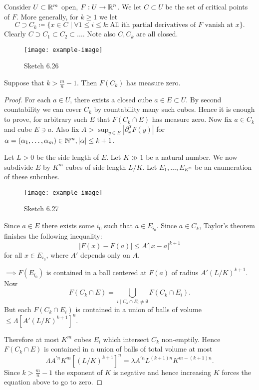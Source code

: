  Consider \(U\subset\mathbb{R}^m\) open, \(F:U\to \mathbb{R}^n\). We let \(C\subset U\)
be the set of critical points of \(F\). More generally, for \(k\geq 1\) we let 
\[C\supset C_k\coloneqq \{x\in C\mid \forall 1\leq i\leq k: \text{All ith partial derivatives of }F\text{ vanish at }x\}.\]
Clearly \(C\supset C_1\subset C_2\subset \dots \). Note also \(C,C_k\) are all closed.
\begin{figure}[H]\label{fig:6.26}
    \centering
    \texttt{[image: example-image]}
    \caption{Sketch 6.26}
\end{figure}

\begin{lemma}\label{lem:6.14}
    Suppose that \(k>\frac{m}{n}-1\). Then \(F(C_k)\) has measure zero.
\end{lemma}

\begin{proof}
    For each \(a\in U\), there exists a closed cube \(a\in E\subset U\). By second countability 
    we can cover \(C_k\) by countability many such cubes. Hence it is enough to prove, for arbitrary 
    such \(E\) that \(F(C_k\cap E)\) has measure zero. Now fix \(a\in C_k\) and cube \(E\ni a\). Also 
    fix \(A>\sup_{y\in E}|\partial_x^{\alpha} F(y)|\) for \(\alpha=(\alpha_1,\dots,\alpha_m)\in \mathbb{N}^m,|\alpha|\leq k+1\).

    Let \(L>0\) be the side length of \(E\). Let \(K\gg 1\) be a natural number.
    We now subdivide \(E\) by \(K^m\) cubes of side length  \(L/K\). Let \(E_1,\dots,E_{K^m}\) be 
    an enumeration of these subcubes.
    \begin{figure}[H]\label{fig:6.27}
        \centering
        \texttt{[image: example-image]}
        \caption{Sketch 6.27}
    \end{figure}
    Since \(a\in E\) there exists some \(i_0\) such that \(a\in E_{i_0}\).
    Since \(a\in C_k\), Taylor's theorem finishes the following inequality:
    \[|F(x)-F(a)|\leq A'|x-a|^{k+1}\] 
    for all \(x\in E_{i_0}\), where \(A'\) depends only on \(A\).

    \(\implies F(E_{i_0})\) is contained in a ball centered at \(F(a)\) of radius \(A'(L/K)^{k+1}\). 
    Now \[F(C_k\cap E)=\bigcup_{i\mid C_k\cap E_i\neq \emptyset} F(C_k\cap E_i).\]
    But each \(F(C_k\cap E_i)\) is contained in a union of balls of volume \(\leq \Lambda\left[A'(L/K)^{k+1}\right]^n\).

    Therefore at most \(K^m\) cubes \(E_i\) which intersect \(C_k\) non-emptily. Hence \(F(C_k\cap E)\)
    is contained in a union of balls of total volume at most 
    \[\Lambda A^{' n} K^m\left[(L/K)^{k+1}\right]^n = \lambda A^{' n} L^{(k+1)n}K^{m-(k+1)n}.\]
    Since \(k> \frac{m}{n}-1\) the exponent of \(K\) is negative and hence increasing \(K\)
    forces the equation above to go to zero.
\end{proof}

